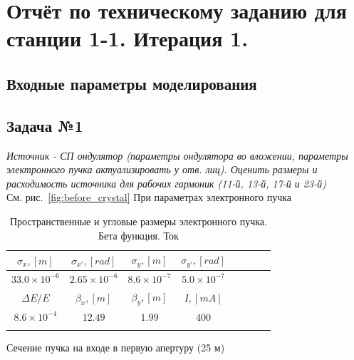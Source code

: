 \documentclass[14pt,a4paper]{extarticle}
\numberwithin{equation}{section}
\begin{document}
\section{Отчёт по техническому заданию для станции 1-1. Итерация 1.}
\subsection{Входные параметры моделирования}

\subsection{Задача №1}
\textit{Источник - СП ондулятор (параметры ондулятора во вложении, параметры электронного пучка актуализировать у отв. лиц). Оценить размеры и расходимость источника для рабочих гармоник (11-й, 13-й, 17-й и 23-й)}\\
См. рис.~\ref{fig:before_crystal}
При параметрах электронного пучка\\
\begin{table}[h!]
	\centering
	\begin{tabular}{cccccccc}
		\hline
		\toprule
		\rule{0pt}{3ex}   $\sigma_x, [m]$ & $\sigma_{x'}, [rad]$ & $\sigma_y, [m]$     & $\sigma_{y'}, [rad]$ \\ \hline
		\rule{0pt}{3ex}   $33.0 \times 10^{-6}$  & $2.65 \times 10^{-6}$  &  $8.6 \times 10^{-7}$ & $5.0 \times 10^{-7}$   \\
		\hline	\hline
		\rule{0pt}{3ex}   $\Delta E / E$ & $\beta_x,[m]$ & $\beta_y,[m]$   & $I,[mA]$\\ \hline
		\rule{0pt}{3ex}	 $8.6 \times 10^{-4}$ & $12.49$ & $1.99$ & $400$ \\ \hline
		\toprule
		\rule{0pt}{4ex}
	\end{tabular}
	\caption{Пространственные и угловые размеры электронного пучка. Бета функция. Ток}
\end{table}


\begin{table}[h!]
	\renewcommand*\dtlrealalign{S}
	\caption{Сечение пучка на входе в первую апертуру (25 м)}
	\centering
\end{table}
\end{document}
